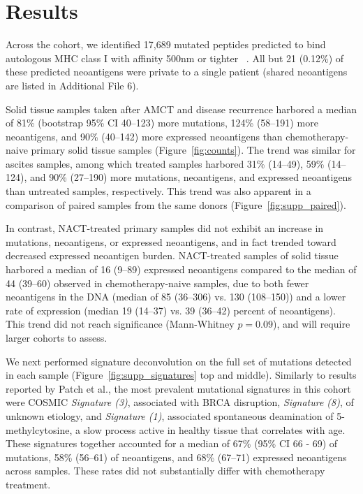 \section*{Results}

Across the cohort, we identified 17,689 mutated peptides predicted to bind autologous MHC class I with affinity 500nm or tighter ~\cite{Sette1994}. All but 21 (0.12\%) of these predicted neoantigens were private to a single patient (shared neoantigens are listed in Additional File 6).

Solid tissue samples taken after AMCT and disease recurrence harbored a median of 81\% (bootstrap 95\% CI 40--123) more mutations, 124\% (58--191) more neoantigens, and 90\% (40--142) more expressed neoantigens than chemotherapy-naive primary solid tissue samples (Figure~\ref{fig:counts}). The trend was similar for ascites samples, among which treated samples harbored 31\% (14--49), 59\% (14--124), and 90\% (27--190) more mutations, neoantigens, and expressed neoantigens than untreated samples, respectively. This trend was also apparent in a comparison of paired samples from the same donors (Figure~\ref{fig:supp_paired}). 

In contrast, NACT-treated primary samples did not exhibit an increase in mutations, neoantigens, or expressed neoantigens, and in fact trended toward decreased expressed neoantigen burden. NACT-treated samples of solid tissue harbored a median of 16 (9--89) expressed neoantigens compared to the median of 44 (39--60) observed in chemotherapy-naive samples, due to both fewer neoantigens in the DNA (median of 85 (36--306) vs. 130 (108--150)) and a lower rate of expression (median 19 (14--37) vs. 39 (36--42) percent of neoantigens). This trend did not reach significance (Mann-Whitney $p=0.09$), and will require larger cohorts to assess.

We next performed signature deconvolution on the full set of mutations detected in each sample (Figure~\ref{fig:supp_signatures} top and middle). Similarly to results reported by Patch et al., the most prevalent mutational signatures in this cohort were COSMIC \textit{Signature (3)}, associated with BRCA disruption, \textit{Signature (8)}, of unknown etiology, and \textit{Signature (1)}, associated spontaneous deamination of 5-methylcytosine, a slow process active in healthy tissue that correlates with age. These signatures together accounted for a median of 67\% (95\% CI 66 - 69) of mutations, 58\% (56--61) of neoantigens, and 68\% (67--71) expressed neoantigens across samples. These rates did not substantially differ with chemotherapy treatment.

